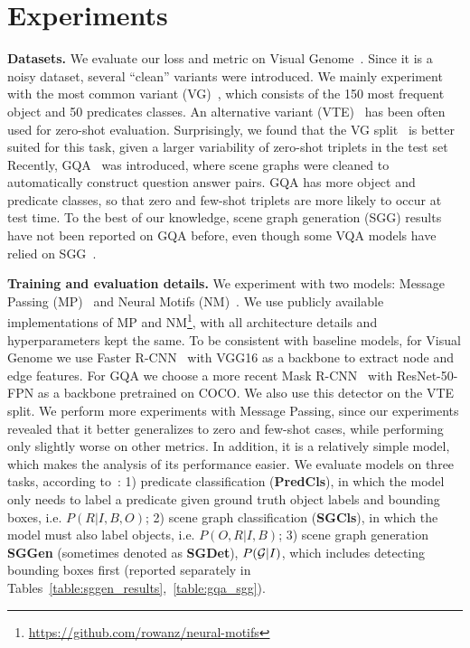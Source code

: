 \vspace{-5pt}
\section{Experiments}
\label{sec:experiments}
\vspace{-5pt}

\textbf{Datasets.}
We evaluate our loss and metric on Visual Genome~\citep{Krishna_2017}. Since it is a noisy dataset, several ``clean'' variants were introduced. We mainly experiment with the most common variant (VG)~\citep{xu2017scene}, which consists of the 150 most frequent object and 50 predicates classes. An alternative variant (VTE)~\citep{zhang2017visual} has been often used for zero-shot evaluation. Surprisingly, we found that the VG split~\citep{xu2017scene} is better suited for this task, given a larger variability of zero-shot triplets in the test set
Recently, GQA~\citep{hudson2019gqa} was introduced, where scene graphs were cleaned to automatically construct question answer pairs. GQA has more object and predicate classes, so that zero and few-shot triplets are more likely to occur at test time. To the best of our knowledge, scene graph generation (SGG) results have not been reported on GQA before, even though some VQA models have relied on SGG~\citep{NSM2019}.

\textbf{Training and evaluation details.}
We experiment with two models: Message Passing (MP)~\citep{xu2017scene} and Neural Motifs (NM)~\citep{zellers2018neural}. We use publicly available implementations of MP and NM\footnote{\url{https://github.com/rowanz/neural-motifs}}, with all architecture details and hyperparameters kept the same. %
To be consistent with baseline models, for Visual Genome we use Faster R-CNN~\citep{ren2015faster} with VGG16 as a backbone to extract node and edge features. For GQA we choose a more recent Mask R-CNN~\citep{he2017mask} with ResNet-50-FPN as a backbone pretrained on COCO. We also use this detector on the VTE split.
We perform more experiments with Message Passing, since our experiments revealed that it better generalizes to zero and few-shot cases, while performing only slightly worse on other metrics. In addition, it is a relatively simple model, which makes the analysis of its performance easier.
We evaluate models on three tasks, according to~\citep{xu2017scene}: 1) predicate classification (\textbf{PredCls}), in which the model only needs to label a predicate given ground truth object labels and bounding boxes, i.e. $P(R|I,B,O)$; 2) scene graph classification (\textbf{SGCls}), in which the model must also label objects, i.e. $P(O,R|I,B)$; 3) scene graph generation \textbf{SGGen} (sometimes denoted as \textbf{SGDet}), $P({\cal G}|I)$, which includes detecting bounding boxes first (reported separately in Tables~\ref{table:sggen_results},~\ref{table:gqa_sgg}).

